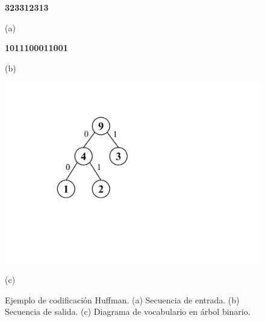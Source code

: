 \begin{figure}
    	\centering
    	\begin{minipage}{0.45\textwidth}
    		\centering

		\textbf{\large \textcolor{color3}{3}\textcolor{color2}{2}\textcolor{color3}{3}\textcolor{color3}{3}\textcolor{color1}{1}\textcolor{color2}{2}\textcolor{color3}{3}\textcolor{color1}{1}\textcolor{color3}{3}}
    		
    		(a)
		\vspace{10mm}  		
    		
    		\textbf{\large \textcolor{color3}{1}\textcolor{color2}{01}\textcolor{color3}{1}\textcolor{color3}{1}\textcolor{color1}{00}\textcolor{color2}{01}\textcolor{color3}{1}\textcolor{color1}{00}\textcolor{color3}{1}}
    		
    		(b)
    	\end{minipage}
    	\begin{minipage}{0.45\textwidth}
    		\centering
    		\includegraphics[scale=.4, clip, trim=160 180 410 0]{img/graphs-huffman.pdf}
    		
    		(c)
    	\end{minipage}

    \caption{Ejemplo de codificación Huffman. (a) Secuencia de entrada. (b) Secuencia de salida. (c) Diagrama de vocabulario en árbol binario.}
    \label{fig:huffman}
\end{figure}
